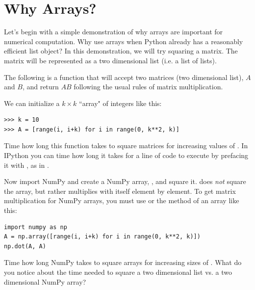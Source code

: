 
\section*{Why Arrays?}
Let's begin with a simple demonstration of why arrays are important for numerical computation.
Why use arrays when Python already has a reasonably efficient list object?
In this demonstration, we will try squaring a matrix.
The matrix will be represented as a two dimensional list (i.e. a list of lists).

The following is a function that will accept two matrices (two dimensional list), $A$ and $B$, and return $AB$ following the usual rules of matrix multiplication.

We can initialize a $k \times k$ ``array" of integers like this:
\begin{lstlisting}
>>> k = 10
>>> A = [range(i, i+k) for i in range(0, k**2, k)]
\end{lstlisting}

\begin{problem}
Time how long this function takes to square matrices for increasing values of .
In IPython you can time how long it takes for a line of code to execute by prefacing it with , as in .

Now import NumPy and create a NumPy array, , and square it.
 does \emph{not} square the array, but rather multiplies  with itself element by element.
To get matrix multiplication for NumPy arrays, you must use  or the  method of an array like this:
\begin{lstlisting}
import numpy as np
A = np.array([range(i, i+k) for i in range(0, k**2, k)])
np.dot(A, A)
\end{lstlisting}
Time how long NumPy takes to square arrays for increasing sizes of .
What do you notice about the time needed to square a two dimensional list vs. a two dimensional NumPy array?
\end{problem}

